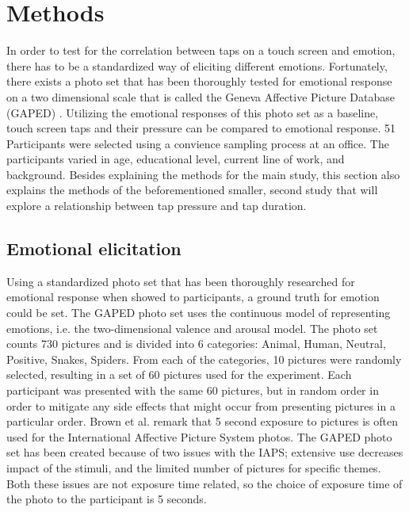\documentclass{sigchi}
\begin{document}


\section{Methods} %
\label{sec:methods}
In order to test for the correlation between taps on a touch screen and emotion, there has to be a standardized way of eliciting different emotions. Fortunately, there exists a photo set that has been thoroughly tested for emotional response on a two dimensional scale that is called the Geneva Affective Picture Database (GAPED) \cite{Dan-glauser2011}. Utilizing the emotional responses of this photo set as a baseline, touch screen taps and their pressure can be compared to emotional response. 51 Participants were selected using a convience sampling process at an office. The participants varied in age, educational level, current line of work, and background. Besides explaining the methods for the main study, this section also explains the methods of the beforementioned smaller, second study that will explore a relationship between tap pressure and tap duration.

\subsection{Emotional elicitation} %
\label{sub:emotional_elicitation}
Using a standardized photo set that has been thoroughly researched for emotional response when showed to participants, a ground truth for emotion could be set. The GAPED photo set uses the continuous model of representing emotions, i.e. the two-dimensional valence and arousal model. The photo set counts 730 pictures and is divided into 6 categories: Animal, Human, Neutral, Positive, Snakes, Spiders. From each of the categories, 10 pictures were randomly selected, resulting in a set of 60 pictures used for the experiment. Each participant was presented with the same 60 pictures, but in random order in order to mitigate any side effects that might occur from presenting pictures in a particular order. Brown et al. \cite{Neuroscience2012} remark that 5 second exposure to pictures is often used for the International Affective Picture System photos. The GAPED photo set has been created because of two issues with the IAPS; extensive use decreases impact of the stimuli, and the limited number of pictures for specific themes. Both these issues are not exposure time related, so the choice of exposure time of the photo to the participant is 5 seconds.
\end{document}
